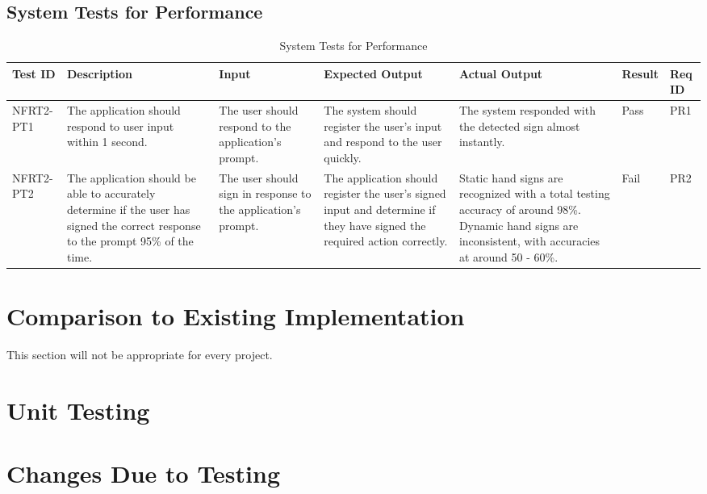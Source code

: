 \documentclass[12pt, titlepage]{article}
\begin{document}
\subsection{System Tests for Performance}

\begin{longtable}{|p{2cm}|p{3cm}|p{2cm}|p{2cm}|p{2cm}|p{2cm}|p{1cm}|}
\caption{System Tests for Performance} \\
\hline
\textbf{Test ID} & \textbf{Description} & \textbf{Input} & \textbf{Expected Output} & \textbf{Actual Output} & \textbf{Result} & \textbf{Req ID}\\
\hline
NFRT2-PT1 & The application should respond to user input within 1 second. & The user should respond to the application's prompt. & The system should register the user's input and respond to the user quickly. & The system responded with the detected sign almost instantly. & Pass & PR1 \\
\hline
NFRT2-PT2 & The application should be able to accurately determine if the user has signed the correct response to the prompt 95\% of the time. & The user should sign in response to the application's prompt. & The application should register the user's signed input and determine if they have signed the required action correctly. & Static hand signs are recognized with a total testing accuracy of around 98\%. Dynamic hand signs are inconsistent, with accuracies at around 50 - 60\%.  & Fail & PR2 \\
\bottomrule
\end{longtable}
	
\section{Comparison to Existing Implementation}	

This section will not be appropriate for every project.

\section{Unit Testing}

\section{Changes Due to Testing}

\end{document}
